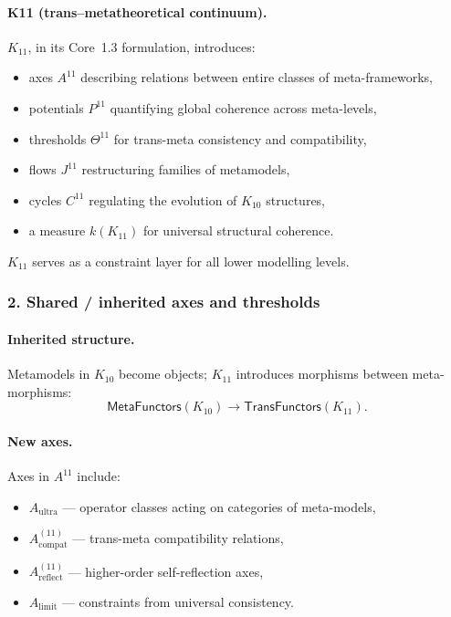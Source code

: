 \paragraph{K11 (trans–metatheoretical continuum).}
$K_{11}$, in its Core~1.3 formulation, introduces:
\begin{itemize}
  \item axes $A^{11}$ describing relations between entire classes of
        meta-frameworks,
  \item potentials $P^{11}$ quantifying global coherence across meta-levels,
  \item thresholds $\Theta^{11}$ for trans-meta consistency and
        compatibility,
  \item flows $J^{11}$ restructuring families of metamodels,
  \item cycles $C^{11}$ regulating the evolution of $K_{10}$ structures,
  \item a measure $k(K_{11})$ for universal structural coherence.
\end{itemize}

$K_{11}$ serves as a constraint layer for all lower modelling levels.

\subsubsection{2. Shared / inherited axes and thresholds}

\paragraph{Inherited structure.}
Metamodels in $K_{10}$ become objects; $K_{11}$ introduces morphisms between
meta-morphisms:
\[
\mathsf{MetaFunctors}(K_{10}) \rightarrow \mathsf{TransFunctors}(K_{11}).
\]

\paragraph{New axes.}
Axes in $A^{11}$ include:
\begin{itemize}
  \item $A_{\mathrm{ultra}}$ — operator classes acting on categories of
        meta-models,
  \item $A_{\mathrm{compat}}^{(11)}$ — trans-meta compatibility relations,
  \item $A_{\mathrm{reflect}}^{(11)}$ — higher-order self-reflection axes,
  \item $A_{\mathrm{limit}}$ — constraints from universal consistency.
\end{itemize}

